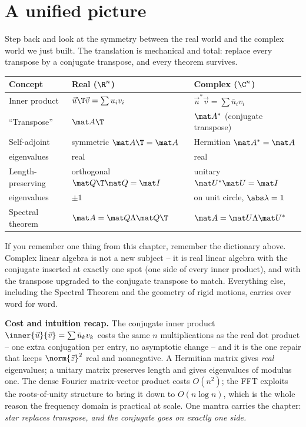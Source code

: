 \section{A unified picture}

Step back and look at the symmetry between the real world and the complex world we
just built. The translation is mechanical and total: replace every transpose by a
conjugate transpose, and every theorem survives.

\begin{center}
\begin{tabular}{@{}lll@{}}
\toprule
\textbf{Concept} & \textbf{Real ($\R^n$)} & \textbf{Complex ($\C^n$)}\\
\midrule
Inner product & $\vec u\T\vec v=\sum u_iv_i$ & $\vec u^{*}\vec v=\sum\bar u_iv_i$\\
``Transpose'' & $\mat A\T$ & $\mat A^{*}$ (conjugate transpose)\\
Self-adjoint & symmetric $\mat A\T=\mat A$ & Hermitian $\mat A^{*}=\mat A$\\
\quad eigenvalues & real & real\\
Length-preserving & orthogonal $\mat Q\T\mat Q=\mat I$ & unitary $\mat U^{*}\mat U=\mat I$\\
\quad eigenvalues & $\pm 1$ & on unit circle, $\abs\lambda=1$\\
Spectral theorem & $\mat A=\mat Q\Lambda\mat Q\T$ & $\mat A=\mat U\Lambda\mat U^{*}$\\
\bottomrule
\end{tabular}
\end{center}

\begin{focusbox}
If you remember one thing from this chapter, remember the dictionary above. Complex
linear algebra is not a new subject -- it is real linear algebra with the conjugate
inserted at exactly one spot (one side of every inner product), and with the
transpose upgraded to the conjugate transpose to match. Everything else, including
the Spectral Theorem and the geometry of rigid motions, carries over word for word.
\end{focusbox}

\begin{recoverybox}
\textbf{Cost and intuition recap.} The conjugate inner product
$\inner{\vec u}{\vec v}=\sum\bar u_kv_k$ costs the same $n$ multiplications as the
real dot product -- one extra conjugation per entry, no asymptotic change -- and it
is the one repair that keeps $\norm{\vec z}^2$ real and nonnegative. A Hermitian
matrix gives \emph{real} eigenvalues; a unitary matrix preserves length and gives
eigenvalues of modulus one. The dense Fourier matrix-vector product costs $O(n^2)$;
the FFT exploits the roots-of-unity structure to bring it down to $O(n\log n)$,
which is the whole reason the frequency domain is practical at scale. One mantra
carries the chapter: \emph{star replaces transpose, and the conjugate goes on
exactly one side.}
\end{recoverybox}

